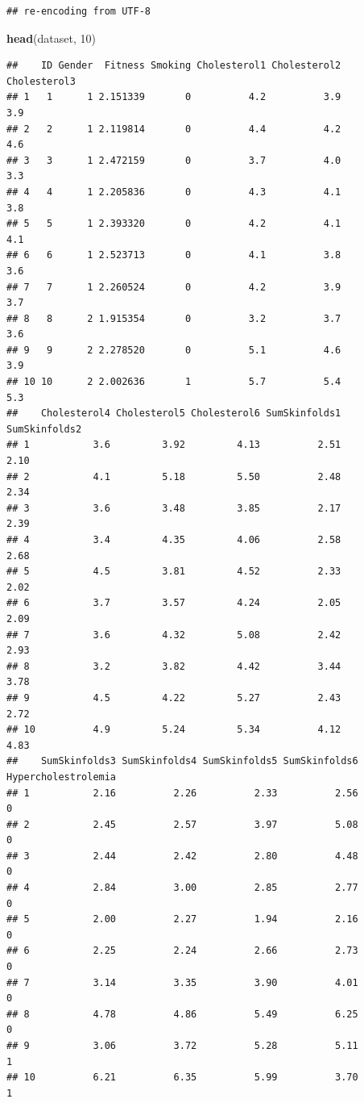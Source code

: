\documentclass[
]{book}
\newenvironment{Shaded}{\begin{snugshade}}{\end{snugshade}}
\newcommand{\DecValTok}[1]{\textcolor[rgb]{0.00,0.00,0.81}{#1}}
\newcommand{\KeywordTok}[1]{\textcolor[rgb]{0.13,0.29,0.53}{\textbf{#1}}}
\newcommand{\NormalTok}[1]{#1}
\begin{document}
\begin{verbatim}
## re-encoding from UTF-8
\end{verbatim}

\begin{Shaded}
\begin{Highlighting}[]
\KeywordTok{head}\NormalTok{(dataset, }\DecValTok{10}\NormalTok{)}
\end{Highlighting}
\end{Shaded}

\begin{verbatim}
##    ID Gender  Fitness Smoking Cholesterol1 Cholesterol2 Cholesterol3
## 1   1      1 2.151339       0          4.2          3.9          3.9
## 2   2      1 2.119814       0          4.4          4.2          4.6
## 3   3      1 2.472159       0          3.7          4.0          3.3
## 4   4      1 2.205836       0          4.3          4.1          3.8
## 5   5      1 2.393320       0          4.2          4.1          4.1
## 6   6      1 2.523713       0          4.1          3.8          3.6
## 7   7      1 2.260524       0          4.2          3.9          3.7
## 8   8      2 1.915354       0          3.2          3.7          3.6
## 9   9      2 2.278520       0          5.1          4.6          3.9
## 10 10      2 2.002636       1          5.7          5.4          5.3
##    Cholesterol4 Cholesterol5 Cholesterol6 SumSkinfolds1 SumSkinfolds2
## 1           3.6         3.92         4.13          2.51          2.10
## 2           4.1         5.18         5.50          2.48          2.34
## 3           3.6         3.48         3.85          2.17          2.39
## 4           3.4         4.35         4.06          2.58          2.68
## 5           4.5         3.81         4.52          2.33          2.02
## 6           3.7         3.57         4.24          2.05          2.09
## 7           3.6         4.32         5.08          2.42          2.93
## 8           3.2         3.82         4.42          3.44          3.78
## 9           4.5         4.22         5.27          2.43          2.72
## 10          4.9         5.24         5.34          4.12          4.83
##    SumSkinfolds3 SumSkinfolds4 SumSkinfolds5 SumSkinfolds6 Hypercholestrolemia
## 1           2.16          2.26          2.33          2.56                   0
## 2           2.45          2.57          3.97          5.08                   0
## 3           2.44          2.42          2.80          4.48                   0
## 4           2.84          3.00          2.85          2.77                   0
## 5           2.00          2.27          1.94          2.16                   0
## 6           2.25          2.24          2.66          2.73                   0
## 7           3.14          3.35          3.90          4.01                   0
## 8           4.78          4.86          5.49          6.25                   0
## 9           3.06          3.72          5.28          5.11                   1
## 10          6.21          6.35          5.99          3.70                   1
\end{verbatim}
\end{document}
